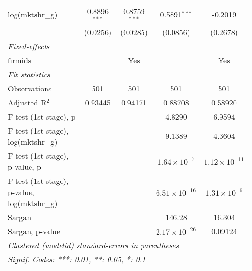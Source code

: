 \begin{tabular}{lcccc}
   log(mktshr\_g)                              & 0.8896$^{***}$                              & 0.8759$^{***}$         & 0.5891$^{***}$        & -0.2019               \\
                                               & (0.0256)                                    & (0.0285)               & (0.0856)              & (0.2678)              \\
   \midrule
   \emph{Fixed-effects}                                                                                                                                               \\
   firmids                                     &                                             & Yes                    &                       & Yes                   \\
   \midrule
   \emph{Fit statistics}                                                                                                                                              \\
   Observations                                & 501                                         & 501                    & 501                   & 501                   \\
   Adjusted R$^2$                              & 0.93445                                     & 0.94171                & 0.88708               & 0.58920               \\
   F-test (1st stage), p                       &                                             &                        & 4.8290                & 6.9594                \\
   F-test (1st stage), log(mktshr\_g)          &                                             &                        & 9.1389                & 4.3604                \\
   F-test (1st stage), p-value, p              &                                             &                        & $1.64\times 10^{-7}$  & $1.12\times 10^{-11}$ \\
   F-test (1st stage), p-value, log(mktshr\_g) &                                             &                        & $6.51\times 10^{-16}$ & $1.31\times 10^{-6}$  \\
   Sargan                                      &                                             &                        & 146.28                & 16.304                \\
   Sargan, p-value                             &                                             &                        & $2.17\times 10^{-26}$ & 0.09124               \\
   \midrule \midrule
   \multicolumn{5}{l}{\emph{Clustered (modelid) standard-errors in parentheses}}                                                                                      \\
   \multicolumn{5}{l}{\emph{Signif. Codes: ***: 0.01, **: 0.05, *: 0.1}}                                                                                              \\
\end{tabular}
\par\endgroup

